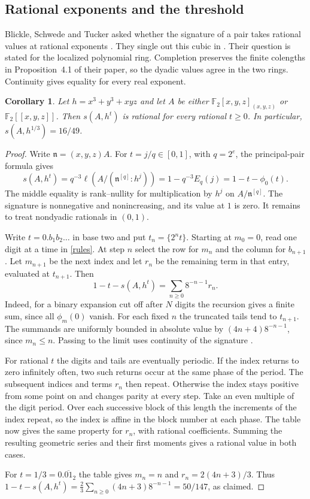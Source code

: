 \documentclass[11pt,a4paper,reqno]{amsart}
\numberwithin{equation}{section}
\theoremstyle{plain}
\newtheorem{corollary}[theorem]{Corollary}
\begin{document}
\subsection{Rational exponents and the threshold}

Blickle, Schwede and Tucker asked whether the signature of a pair takes rational values at rational exponents \cite[Question~4.7]{BST}. They single out this cubic in \cite[Remark~4.10]{BST}. Their question is stated for the localized polynomial ring. Completion preserves the finite colengths in Proposition~4.1 of their paper, so the dyadic values agree in the two rings. Continuity gives equality for every real exponent.

\begin{corollary}\label{cor:rational-exponents}
Let $h=x^3+y^3+xyz$ and let $A$ be either $\mathbb F_2[x,y,z]_{(x,y,z)}$ or $\mathbb F_2[[x,y,z]]$. Then $s(A,h^t)$ is rational for every rational $t\ge0$. In particular, $s(A,h^{1/3})=16/49$.
\end{corollary}
\begin{proof}
Write $\mathfrak n=(x,y,z)A$. For $t=j/q\in[0,1]$, with $q=2^e$, the principal-pair formula \cite[Proposition~4.1]{BST} gives
\[
 s(A,h^t)=q^{-3}\ell(A/(\mathfrak n^{[q]}:h^j))
          =1-q^{-3}E_q(j)=1-t-\phi_0(t).
\]
The middle equality is rank--nullity for multiplication by $h^j$ on $A/\mathfrak n^{[q]}$. The signature is nonnegative and nonincreasing, and its value at $1$ is zero. It remains to treat nondyadic rationals in $(0,1)$.

Write $t=0.b_1b_2\ldots$ in base two and put $t_n=\{2^nt\}$. Starting at $m_0=0$, read one digit at a time in \eqref{rules}. At step $n$ select the row for $m_n$ and the column for $b_{n+1}$. Let $m_{n+1}$ be the next index and let $r_n$ be the remaining term in that entry, evaluated at $t_{n+1}$. Then
\[
 1-t-s(A,h^t)=\sum_{n\ge0}8^{-n-1}r_n .
\]
Indeed, for a binary expansion cut off after $N$ digits the recursion gives a finite sum, since all $\phi_m(0)$ vanish. For each fixed $n$ the truncated tails tend to $t_{n+1}$. The summands are uniformly bounded in absolute value by $(4n+4)8^{-n-1}$, since $m_n\le n$. Passing to the limit uses continuity of the signature \cite[Theorem~3.2]{BST}.

For rational $t$ the digits and tails are eventually periodic. If the index returns to zero infinitely often, two such returns occur at the same phase of the period. The subsequent indices and terms $r_n$ then repeat. Otherwise the index stays positive from some point on and changes parity at every step. Take an even multiple of the digit period. Over each successive block of this length the increments of the index repeat, so the index is affine in the block number at each phase. The table now gives the same property for $r_n$, with rational coefficients. Summing the resulting geometric series and their first moments gives a rational value in both cases.

For $t=1/3=0.\overline{01}_2$ the table gives $m_n=n$ and $r_n=2(4n+3)/3$. Thus $1-t-s(A,h^t)=\frac23\sum_{n\ge0}(4n+3)8^{-n-1}=50/147$, as claimed.
\end{proof}
\end{document}
